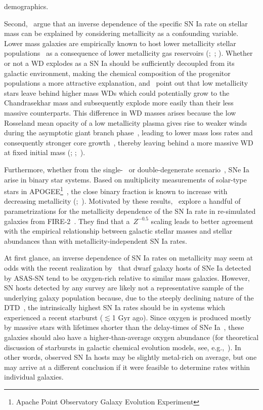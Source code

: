 \documentclass[ms.tex]{subfiles}
\begin{document}
demographics.
\par
Second,~\citet{Kistler2013} argue that an inverse dependence of the
specific SN Ia rate on stellar mass can be explained by considering metallicity
as a confounding variable.
Lower mass galaxies are empirically known to host lower metallicity stellar
populations~\citep{Gallazzi2005, Kirby2013} as a consequence of lower
metallicity gas reservoirs (\citealp{Tremonti2004};~\citealp*{Zahid2011};
\citealp{Andrews2013, Zahid2014}).
Whether or not a WD explodes as a SN Ia should be sufficiently decoupled from
its galactic environment, making the chemical composition of the progenitor
populations a more attractive explanation, and~\citet{Kistler2013} point out
that low metallicity stars leave behind higher mass WDs which could potentially
grow to the Chandrasekhar mass and subsequently explode more easily than their
less massive counterparts.
This difference in WD masses arises because the low Rosseland mean opacity of a
low metallicity plasma gives rise to weaker winds during the asymptotic giant
branch phase~\citep{Willson2000, Marigo2007}, leading to lower mass loss rates
and consequently stronger core growth~\citep{Kalirai2014}, thereby leaving
behind a more massive WD at fixed initial mass (\citealp{Umeda1999};
\citealp*{Meng2008};~\citealp{Zhao2012}).
\par
Furthermore, whether from the single-~\citep[e.g.][]{Whelan1973} or
double-degenerate scenario~\citep[e.g.][]{Iben1984, Webbink1984}, SNe Ia arise
in binary star systems.
Based on multiplicity measurements of solar-type stars in APOGEE\footnote{
	Apache Point Observatory Galaxy Evolution Experiment
}~\citep{Majewski2017}, the close binary fraction is known to increase with
decreasing metallicity (\citealp{Badenes2018};~\citealp*{Moe2019}).
Motivated by these results,~\citet{Gandhi2022} explore a handful of
parametrizations for the metallicity dependence of the SN Ia rate in
re-simulated galaxies from FIRE-2~\citep{Hopkins2018}.
They find that a~$Z^{-0.5}$ scaling leads to better agreement with the empirical
relationship between galactic stellar masses and stellar abundances than with
metallicity-independent SN Ia rates.
\par
At first glance, an inverse dependence of SN Ia rates on metallicity may seem
at odds with the recent realization by~\citet{Holoien2022} that dwarf galaxy
hosts of SNe Ia detected by ASAS-SN tend to be oxygen-rich relative to similar
mass galaxies.
However, SN hosts detected by any survey are likely not a representative sample
of the underlying galaxy population because, due to the steeply declining
nature of the DTD~\citep[e.g.][]{Maoz2012a}, the intrinsically highest SN Ia
rates should be in systems which experienced a recent starburst ($\lesssim$1
Gyr ago).
Since oxygen is produced mostly by massive stars with lifetimes shorter than
the delay-times of SNe Ia~\citep*[e.g.][]{Hurley2000, Johnson2019}, these
galaxies should also have a higher-than-average oxygen abundance (for
theoretical discussion of starbursts in galactic chemical evolution models,
see, e.g.,~\citealt{Johnson2020}).
In other words, observed SN Ia hosts may be slightly metal-rich on average, but
one may arrive at a different conclusion if it were feasible to determine rates
within individual galaxies.
\end{document}
